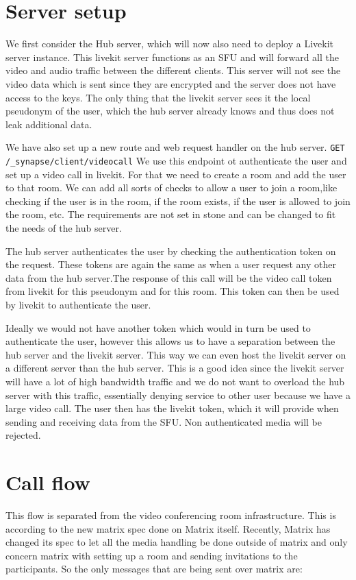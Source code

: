 \documentclass{report}
\begin{document}
    \section{Server setup}
    We first consider the Hub server, which will now also need to deploy a Livekit server instance. This livekit server
    functions as an SFU and will forward all the video and audio traffic between the different clients. This server will
    not see the video data which is sent since they are encrypted and the server does not have access to the keys. The
    only thing that the livekit server sees it the local pseudonym of the user, which the hub server already knows and
    thus does not leak additional data.

    We have also set up a new route and web request handler on the hub server.
    \texttt{GET /\_synapse/client/videocall} We use this endpoint ot authenticate the user and set up a video call
    in livekit. For that we need to create a room and add the user to that room. We can add all sorts of checks to allow
    a user to join a room,like checking if the user is in the room, if the room exists, if the user is allowed to
    join the room, etc. The requirements are not set in stone and can be
    changed to fit the needs of the hub server.

    The hub server authenticates the user by checking the authentication token on
    the request. These tokens are again the same as when a user request any other data from the hub server.The response
    of this call will be the video call token from livekit for this pseudonym and for this room. This token can then
    be used by livekit to authenticate the user.

    Ideally we would not have another token which would in turn be used to authenticate the user, however this allows us
    to have a separation between the hub server and the livekit server. This way we can even host the livekit server on
    a different server than the hub server. This is a good idea since the livekit server will have a lot of
    high bandwidth traffic and we do not want to overload the hub server with this traffic, essentially denying service
    to other user because we have a large video call. The user then has the livekit token, which it will provide when
    sending and receiving data from the SFU. Non authenticated media will be rejected.


    \section{Call flow}
    This flow is separated from the video conferencing room infrastructure.
    This is according to the new matrix spec done on Matrix itself. Recently, Matrix has changed its spec to let all the
    media handling be done outside of matrix
    and only concern matrix with setting up a room and sending invitations to the participants. So the only messages
    that are being sent over matrix are:
\end{document}
